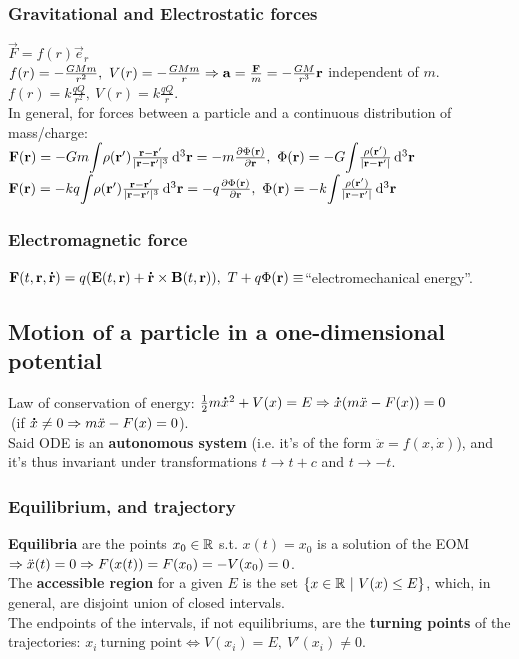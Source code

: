 \subsubsection*{Gravitational and Electrostatic forces}
$\vec{F}=f(r)\vec{e}_{r}$\\
$f(r)=-\frac{GMm}{r^{2}},\ V(r)=-\frac{GMm}{r}\then \vec{a}=\frac{\vec{F}}{m}=-\frac{GM}{r^{3}}\vec{r}$ independent of $m$.\\
$f(r)=k\frac{qQ}{r^{2}},\ V(r)=k\frac{qQ}{r}$.\\
In general, for forces between a particle and a continuous distribution of mass/charge:\\
$\vec{F}(\vec{r})=-Gm\scaleint{5ex}\rho(\vec{r}')\frac{\vec{r}-\vec{r}'}{|\vec{r}-\vec{r}'|^{3}}\dd[3]{\vec{r}}=-m\partials{\Phi(\vec{r})}{\vec{r}},\ \Phi(\vec{r})=-G\scaleint{5ex}\frac{\rho(\vec{r'})}{|\vec{r}-\vec{r}'|}\dd[3]{\vec{r}}$\\
$\vec{F}(\vec{r})=-kq\scaleint{5ex}\rho(\vec{r}')\frac{\vec{r}-\vec{r}'}{|\vec{r}-\vec{r}'|^{3}}\dd[3]{\vec{r}}=-q\partials{\Phi(\vec{r})}{\vec{r}},\ \Phi(\vec{r})=-k\scaleint{5ex}\frac{\rho(\vec{r'})}{|\vec{r}-\vec{r}'|}\dd[3]{\vec{r}}$



\subsubsection*{Electromagnetic force}
$\vec{F}(t,\vec{r},\dotv{r})=q(\vec{E}(t,\vec{r})+\dotv{r}\times\vec{B}(t,\vec{r})),\ T+q\Phi(\vec{r})\equiv$``electromechanical energy''.




\subsection{Motion of a particle in a one-dimensional potential}
Law of conservation of energy: $\frac{1}{2}m\accentset{\mbox{\bfseries .}}{x}^{2}+V(x)=E\Rightarrow \accentset{\mbox{\bfseries .}}{x}(m\ddot{x}-F(x))=0$\\
$\ $\hfill(if $\accentset{\mbox{\bfseries .}}{x}\neq0\Rightarrow m\ddot{x}-F(x)=0$).\\
Said ODE is an \textbf{autonomous system} (i.e. it's of the form $\ddot{x}=f(x,\dot{x})$), and it's thus invariant under transformations $t\to t+c$ and $t\to -t$.

\subsubsection*{Equilibrium, and trajectory}
\textbf{Equilibria} are the points $x_{0}\in\mathbb{R}$ s.t. $x(t)=x_{0}$ is a solution of the EOM $\Rightarrow \ddot{x}(t)=0\Rightarrow F(x(t))=F(x_{0})=-V(x_{0})=0$.\\
The \textbf{accessible region} for a given $E$ is the set $\{x\in\mathbb{R}\ |\ V(x)\leq E\}$, which, in general, are disjoint union of closed intervals.\\
The endpoints of the intervals, if not equilibriums, are the \textbf{turning points} of the trajectories: $x_{i} \ \text{turning point} \iff V(x_{i})=E,\ V'(x_{i})\neq0$.
\smallskip


